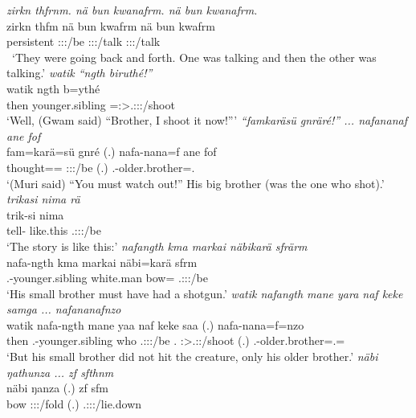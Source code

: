 \begin{exe}
	\emph{zirkn thfrnm. nä bun kwanafrm. nä bun kwanafrm.}\\
	\gll zirkn thfm {nä bun} kwafrm {nä bun} kwafrm\\ 
	persistent \Stdu:\Sbj:\Pst:\Dur/be {\Indf} \Sg:\Sbj:\Pst:\Dur/talk {\Indf} \Sg:\Sbj:\Pst:\Dur/talk\\\
	\trans `They were going back and forth. One was talking and then the other was talking.'
\newpage 	
{} 
	\emph{watik ``ngth biruthé!''}\\
	\gll watik ngth b=ythé\\ 
	then younger.sibling \Med=\Fsg:\Sbj>\Tsg.\Masc:\Obj:\Nonpast:\Ipfv/shoot\\
	\trans `Well, (Gwam said) ``Brother, I shoot it now!'''
	\emph{``famkaräsü gnräré!'' ... nafananaf ane fof}\\
	\gll fam=karä=sü gnré (.) nafa-nana=f ane fof\\ 
	thought=\Prop=\Etc{} \Ssg:\Sbj:\Imp:\Ipfv/be (.) \Third.\Poss-older.brother=\Erg.{\Sg} {\Dem} {\Emph}\\
	\trans `(Muri said) ``You must watch out!'' His big brother (was the one who shot).'
\exi{53} 
	\emph{trikasi nima rä}\\
	\gll trik-si nima \\ 
	tell-{\Nmlz} like.this \Tsg.\F:\Sbj:\Nonpast:\Ipfv/be\\
	\trans `The story is like this:'
	\emph{nafangth kma markai näbikarä sfrärm}\\
	\gll nafa-ngth kma markai näbi=karä sfrm\\ 
	\Third.\Poss-younger.sibling {\Pot} white.man bow={\Prop} \Tsg.\Masc:\Sbj:\Pst:\Dur/be\\
	\trans `His small brother must have had a shotgun.'
	\emph{watik nafangth mane yara naf keke samga ... nafananafnzo}\\
	\gll watik nafa-ngth mane yaa naf keke saa (.) nafa-nana=f=nzo\\ 
	then \Third.\Poss-younger.sibling who \Tsg.\Masc:\Sbj:\Pst:\Ipfv/be \Tsg.{\Erg} {\Neg} \Sg:\Sbj>\Tsg.\Masc:\Pst:\Pfv/shoot (.) \Third.\Poss-older.brother=\Erg.\Sg=\Only\\
	\trans `But his small brother did not hit the creature, only his older brother.'
\exi{56} 
	\emph{näbi ŋathunza ... zf sfthnm}\\
	\gll näbi ŋanza (.) zf sfm\\ 
	bow \Sg:\Sbj:\Pst:\Ipfv/fold (.) {\Imm} \Tsg.\Masc:\Sbj:\Pst:\Dur/lie.down\\

\end{exe}
